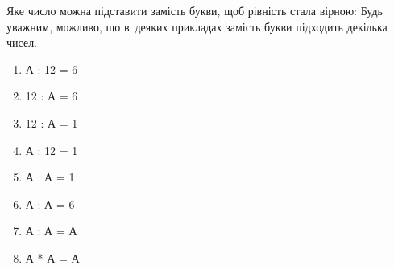 \problem
Яке число можна підставити замість букви, щоб рівність стала вірною:
Будь уважним, можливо, що в~деяких прикладах замість букви підходить декілька чисел.
\begin{multicols}{2}
    \begin{enumerate}
        \item А : 12 = 6
        \item 12 : А = 6
        \item 12 : А = 1
        \item А : 12 = 1
        \item А : А = 1
        \item А : А = 6
        \item А : А = А
        \item А * А = А
    \end{enumerate}
\end{multicols}
